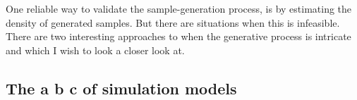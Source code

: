 \documentclass[twoside]{article}
\begin{document}
One reliable way to validate the sample-generation process, is by estimating the density of generated samples. But there are situations when this is infeasible. There are two interesting approaches to when the generative process is intricate and  which I wish to look a closer look at.


\subsection{ The a b c of simulation models} %
\label{sub:_the_a_b_c_of_simulation_models}

\end{document}
